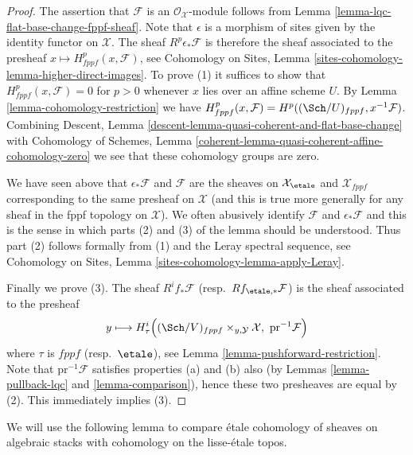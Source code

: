 \begin{proof}
The assertion that $\mathcal{F}$ is an $\mathcal{O}_\mathcal{X}$-module
follows from
Lemma \ref{lemma-lqc-flat-base-change-fppf-sheaf}.
Note that $\epsilon$ is a morphism of sites given by the identity
functor on $\mathcal{X}$. The sheaf $R^p\epsilon_*\mathcal{F}$ is therefore
the sheaf associated to the presheaf
$x \mapsto H^p_{fppf}(x, \mathcal{F})$, see
Cohomology on Sites, Lemma \ref{sites-cohomology-lemma-higher-direct-images}.
To prove (1) it suffices to show that
$H^p_{fppf}(x, \mathcal{F}) = 0$ for $p > 0$
whenever $x$ lies over an affine scheme $U$. By
Lemma \ref{lemma-cohomology-restriction}
we have
$H^p_{fppf}(x, \mathcal{F}) = H^p((\Sch/U)_{fppf}, x^{-1}\mathcal{F})$.
Combining
Descent, Lemma \ref{descent-lemma-quasi-coherent-and-flat-base-change}
with Cohomology of Schemes, Lemma
\ref{coherent-lemma-quasi-coherent-affine-cohomology-zero}
we see that these cohomology groups are zero.

\medskip\noindent
We have seen above that $\epsilon_*\mathcal{F}$ and $\mathcal{F}$ are the
sheaves on $\mathcal{X}_\etale$ and $\mathcal{X}_{fppf}$
corresponding to the same presheaf on $\mathcal{X}$ (and this is true more
generally for any sheaf in the fppf topology on $\mathcal{X}$).
We often abusively identify $\mathcal{F}$ and $\epsilon_*\mathcal{F}$
and this is the sense in which parts (2) and (3) of the lemma should be
understood. Thus part (2) follows formally from (1) and the Leray spectral
sequence, see
Cohomology on Sites, Lemma \ref{sites-cohomology-lemma-apply-Leray}.

\medskip\noindent
Finally we prove (3). The sheaf $R^if_*\mathcal{F}$
(resp.\ $Rf_{\etale, *}\mathcal{F}$)
is the sheaf associated to the presheaf
$$
y \longmapsto
H^i_\tau\Big((\Sch/V)_{fppf} \times_{y, \mathcal{Y}} \mathcal{X},
\ \text{pr}^{-1}\mathcal{F}\Big)
$$
where $\tau$ is $fppf$ (resp.\ $\etale$), see
Lemma \ref{lemma-pushforward-restriction}.
Note that $\text{pr}^{-1}\mathcal{F}$ satisfies properties (a) and (b)
also (by Lemmas \ref{lemma-pullback-lqc} and \ref{lemma-comparison}),
hence these two presheaves are equal by (2).
This immediately implies (3).
\end{proof}

\noindent
We will use the following lemma to compare \'etale cohomology of sheaves
on algebraic stacks with cohomology on the lisse-\'etale topos.

